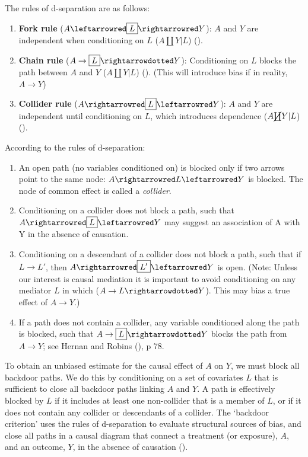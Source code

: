 \documentclass[
  singlecolumn]{article}
\providecommand{\tightlist}{%
  \setlength{\itemsep}{0pt}\setlength{\parskip}{0pt}}\usepackage{longtable,booktabs,array}
\begin{document}
The rules of d-separation are as follows:

\begin{enumerate}
\def\labelenumi{\alph{enumi}.}
\item
  \textbf{Fork rule} (\(A \leftarrowred \boxed{L} \rightarrowred Y\)):
  \(A\) and \(Y\) are independent when conditioning on \(L\)
  (\(A \coprod Y | L\)) ().
\item
  \textbf{Chain rule} (\(A \to \boxed{L} \rightarrowdotted Y\)):
  Conditioning on \(L\) blocks the path between \(A\) and \(Y\)
  (\(A \coprod Y | L\)) (). (This
  will introduce bias if in reality, \(A \to Y\))
\item
  \textbf{Collider rule}
  (\(A \rightarrowred \boxed{L} \leftarrowred Y\)): \(A\) and \(Y\) are
  independent until conditioning on \(L\), which introduces dependence
  (\(A \cancel{\coprod} Y | L\)) ().
\end{enumerate}

According to the rules of d-separation:

\begin{enumerate}
\def\labelenumi{\arabic{enumi}.}
\tightlist
\item
  An open path (no variables conditioned on) is blocked only if two
  arrows point to the same node: \(A \rightarrowred L \leftarrowred Y\)
  is blocked. The node of common effect is called a \emph{collider}.
\item
  Conditioning on a collider does not block a path, such that
  \(A \rightarrowred \boxed{L} \leftarrowred Y\) may suggest an
  association of A with Y in the absence of causation.
\item
  Conditioning on a descendant of a collider does not block a path, such
  that if \(L \to \boxed{L'}\), then
  \(A \rightarrowred \boxed{L'} \leftarrowred Y\) is open. (Note: Unless
  our interest is causal mediation it is important to avoid conditioning
  on any mediator \(L\) in which
  (\(A \rightarrow {L} \rightarrowdotted Y\)). This may bias a true
  effect of \(A \to Y\).)
\item
  If a path does not contain a collider, any variable conditioned along
  the path is blocked, such that
  \(A \rightarrow \boxed{L} \rightarrowdotted Y\) blocks the path from
  \(A\to Y\); see Hernan and Robins (), p
  78.
\end{enumerate}

To obtain an unbiased estimate for the causal effect of \(A\) on \(Y\),
we must block all backdoor paths. We do this by conditioning on a set of
covariates \(L\) that is sufficient to close all backdoor paths linking
\(A\) and \(Y\). A path is effectively blocked by \(L\) if it includes
at least one non-collider that is a member of \(L\), or if it does not
contain any collider or descendants of a collider. The `backdoor
criterion' uses the rules of d-separation to evaluate structural sources
of bias, and close all paths in a causal diagram that connect a
treatment (or exposure), \(A\), and an outcome, \(Y\), in the absence of
causation ().
\end{document}
